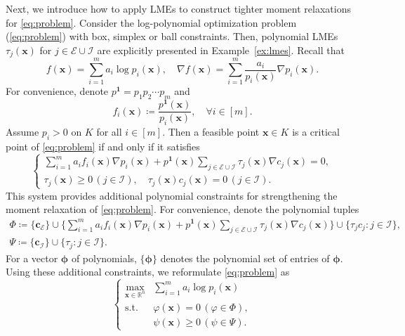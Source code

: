 \documentclass[pdflatex,sn-mathphys-num]{sn-jnl}%
\newcommand{\re}{\mathbb{R}}
\newcommand{\rd}[1]{{\color{red}#1}}
\newcommand{\vect}[1]{\boldsymbol{#1}}
\newcommand{\st}{\mathrm{s.t.}}
\theoremstyle{thmstyleone}%
\theoremstyle{thmstyletwo}%
\theoremstyle{thmstylethree}%
\begin{document}
Next, we introduce how to apply LMEs to construct tighter
moment relaxations for \eqref{eq:problem}.
Consider the log-polynomial optimization problem (\ref{eq:problem})
with box, simplex or ball constraints.
Then, polynomial LMEs $\tau_j(\vect{x})$ for $j\in\mathcal{E}\cup \mathcal{I}$ are 
explicitly presented in Example~\ref{ex:lmes}. Recall that 
\[
f(\vect{x}) = \sum\limits_{i=1}^m a_i \log p_i(\vect{x}),\quad
\nabla f(\vect{x}) = \sum\limits_{i=1}^m \frac{a_i}{p_i(\vect{x})}\nabla p_i(\vect{x}).
\]
For convenience, denote $p^{\mathbf{1}} = p_1p_2\cdots p_m$ and
\[
f_i(\vect{x}) \coloneqq \frac{p^{\mathbf{1}}(\vect{x})}{p_i(\vect{x})},\quad \forall i\in[m].
\]
Assume \rd{$p_i>0$ on $K$ for all $i\in[m]$}.
Then a feasible point $\vect{x}\in K$ is a critical point of \eqref{eq:problem} 
if and only if it satisfies 
\[
\left\{\begin{array}{l}
	\sum\limits_{i=1}^m a_i f_i(\vect{x})\nabla p_i(\vect{x}) 
	+ p^{\mathbf{1}}(\vect{x})\sum\limits_{j\in \mathcal{E}\cup \mathcal{I}} 
	\tau_j(\vect{x})\nabla c_j(\vect{x}) = 0,\\
	\tau_j(\vect{x})\ge 0\,(j\in\mathcal{I}),\quad  \tau_j(\vect{x})c_j(\vect{x})=0\, (j\in\mathcal{I}).
\end{array}\right.
\]
This system provides additional polynomial constraints for
strengthening the moment relaxation of \eqref{eq:problem}.
For convenience, denote the polynomial tuples
\[	\begin{array}{l}
	\Phi\coloneq \{ \vect{c}_{\mathcal{E}} \} \cup \Big\{ \sum\limits_{i=1}^m 
	a_i f_i(\vect{x})\nabla p_i(\vect{x}) + p^{\mathbf{1}}(\vect{x})\sum\limits_{j\in \mathcal{E}\cup \mathcal{I}} 
	\tau_j(\vect{x})\nabla c_j(\vect{x}) \Big\} \cup 
	\{\tau_jc_j: j\in \mathcal{I}\},  \\
	\Psi\coloneq \{ \vect{c}_{\mathcal{I}} \} \cup \{ \tau_j: j\in \mathcal{I} \}.
\end{array}
\]
For a vector $\vect{\phi}$ of polynomials, 
$\{\vect{\phi}\}$ denotes the polynomial set of entries of $\vect{\phi}$.
\rd{Using these additional constraints, we reformulate
\eqref{eq:problem} as}
\begin{equation}\label{eq:problemhatLME}
	\left\{\begin{array}{cl}
		\max\limits_{\vect{x}\in\re^n} 
		& \sum\limits_{i=1}^m a_i \log p_i(\vect{x})\\
		\st
		& \varphi(\vect{x}) = 0 \, (\varphi\in\Phi),\\
		& \psi(\vect{x})\ge 0 \, (\psi\in\Psi).
	\end{array}\right.
\end{equation}
\end{document}
